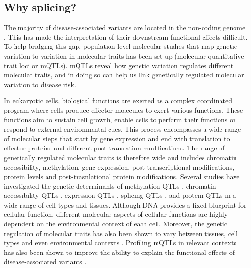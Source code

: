 

\subsection{Why splicing?}
The majority of disease-associated variants are located in the non-coding genome \cite{Hindorff2009-te}. This has made the interpretation of their downstream functional effects difficult. To help bridging this gap, population-level molecular studies that map genetic variation to variation in molecular traits has been set up (molecular quantitative trait loci or mQTLs). mQTLs reveal how genetic variation regulates different molecular traits, and in doing so can help us link genetically regulated molecular variation to disease risk. 

In eukaryotic cells, biological functions are exerted as a complex coordinated program where cells produce effector molecules to exert various functions. These functions aim to sustain cell growth, enable cells to perform their functions or respond to external environmental cues. This process encompasses a wide range of molecular steps that start by gene expression and end with translation to effector proteins and different post-translation modifications. The range of genetically regulated molecular traits is therefore wide and includes chromatin accessibility, methylation, gene expression, post-transcriptional modifications, protein levels and post-trasnlational protein modifications. Several studies have investigated the genetic determinants of methylation QTLs \cite{Oliva2023-nt,Hannon2016-mt,Morrow2018-fv,Taylor2019-tm,Huan2019-ke,Andrews2017-os}, chromatin accessibility QTLs \cite{Alasoo2018-pv,Currin2021-kp}, expression QTLs \cite{The_GTEx_Consortium2020-gg,Vosa2021-pb,Kerimov2021-gh}, splicing QTLs \cite{The_GTEx_Consortium2020-gg,Qi2022-iz}, and protein QTLs \cite{Yao2018-oy,Sun2018-uy} in a wide range of cell types and tissues. Although DNA provides a fixed blueprint for cellular function, different molecular aspects of cellular functions are highly dependent on the environmental context of each cell. Moreover, the genetic regulation of molecular traits has also been shown to vary between tissues, cell types and even environmental contexts \cite{Zhernakova2017-uo,Mu2021-ar}. Profiling mQTLs in relevant contexts has also been shown to improve the ability to explain the functional effects of disease-associated variants \cite{Ongen2017-cd}.\\

